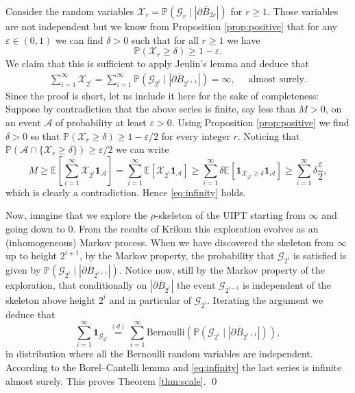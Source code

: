 \documentclass[AHL,XML,longabstracts,Unicode,NoSaveZebib]{cedram}
\begin{document}
Consider the random variables $ \mathcal{X}_{r}= \mathbb{P}( \mathcal{G}_{r} \mid | \partial \overline{B}_{2r}|)$ for $r \geq 1$. Those variables are not independent but we know from Proposition \ref{prop:positive} that for any $ \varepsilon \in (0,1)$ we can find $\delta>0$ such that for all $r \geq 1$ we have
$$ \mathbb{P}( \mathcal{X}_{r} \geq \delta) \geq 1- \varepsilon.$$ We claim that this is sufficient to apply Jeulin's lemma \cite[Proposition 4 c]{Jeu82} and deduce that
 \begin{eqnarray} \sum_{i=1}^{\infty} \mathcal{X}_{2^{i}} = \sum_{i =1}^{\infty} \mathbb{P}( \mathcal{G}_{2^{i}} \mid | \partial \overline{B}_{2^{i+1}}|) = \infty, \quad \mbox{ almost surely}.   \label{eq:infinity}\end{eqnarray}
 Since the proof is short, let us include it here for the sake of completeness: Suppose by contradiction that the above series is finite, say less than $M>0$, on an event $ \mathcal{A}$ of probability at least $\varepsilon>0$. Using Proposition \ref{prop:positive} we find $\delta >0$ so that $\mathbb{P}( \mathcal{X}_{r} \geq \delta) \geq 1- \varepsilon/2$ for every integer $r$. Noticing that $ \mathbb{P}( \mathcal{A} \cap \{ \mathcal{X}_{r} \geq \delta\}) \geq \varepsilon/2$ we can write
 $$ M \geq \mathbb{E}\left[ \sum_{i=1}^{\infty} \mathcal{X}_{2^{i}} \mathbf{1}_{ \mathcal{A}}\right] = \sum_{i=1}^{\infty}  \mathbb{E}[ \mathcal{X}_{2^{i}} \mathbf{1}_{ \mathcal{A}} ] \geq  \sum_{i=1}^{\infty}  \delta \mathbb{E}[  \mathbf{1}_{ \mathcal{X}_{2^{i}} \geq \delta} \mathbf{1}_{ \mathcal{A}} ] \geq \sum_{i=1}^{\infty} \delta \frac{ \varepsilon}{2},$$ which is clearly a contradiction. Hence \eqref{eq:infinity} holds.\medskip


Now, imagine that we explore the $\rho$-skeleton of the UIPT starting from $\infty$ and going down to $0$. From the results of Krikun \cite{Kr,CLGfpp} this exploration evolves as an (inhomogeneous) Markov process. When we have discovered the skeleton from $\infty$ up to height $2^{i+1}$, by the Markov property, the probability that $ \mathcal{G}_{2^{i}}$ is satisfied is given by $ \mathbb{P}( \mathcal{G}_{2^{i}} \mid | \partial \overline{B}_{2^{i+1}}|)$. Notice now, still by the Markov property of the exploration, that conditionally on $ | \partial \overline{B}_{2^{i}}|$ the event $  \mathcal{G}_{2^{i-1}}$ is independent of the skeleton above height $2^{i}$ and in particular of $ \mathcal{G}_{2^{i}}$. Iterating the argument we deduce that
$$ \sum_{i =1}^{\infty}  \mathbf{1}_{\mathcal{G}_{2^{i}}}  \overset{(d)}{=}  \sum_{i=1}^{\infty} \mathrm{Bernoulli}(\mathbb{P}( \mathcal{G}_{2^{i}} \mid | \partial \overline{B}_{2^{i+1}}|)),$$ in distribution where all the Bernoulli random variables are independent. According to the Borel--Cantelli lemma and \eqref{eq:infinity} the last series is infinite almost surely. This proves Theorem \ref{thm:scale}. \qed
\end{document}
